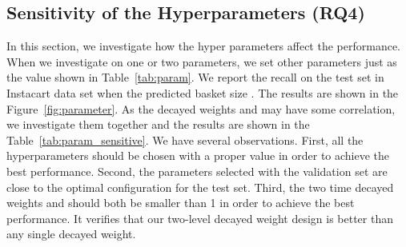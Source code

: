 \documentclass[sigconf]{acmart}
\begin{document}
\begin{table}[ht]
\small
\caption{The effect of each component in the TIFU-KNN.}
\label{exp:comparison3}
\end{table}




\subsection{Sensitivity of the Hyperparameters (RQ4)}

In this section, we investigate how the hyper parameters affect the performance.   When we investigate on one or two parameters,  we set other parameters just as the value shown in Table~\ref{tab:param}. We report the recall on the test set in Instacart data set when the  predicted basket size . The results are shown in the Figure~\ref{fig:parameter}. As  the decayed weights  and  may have  some correlation, we investigate  them together and the results are shown in the Table~\ref{tab:param_sensitive}. We have several observations. 
First, all the hyperparameters should be chosen with a proper value in order to achieve the best performance.  Second, the  parameters  selected with the validation set are close to the optimal  configuration for the test set. Third, the two time decayed weights  and  should both be smaller than 1 in order to achieve the best performance. It verifies that our two-level decayed weight design is better than any single  decayed weight.  
\end{document}
